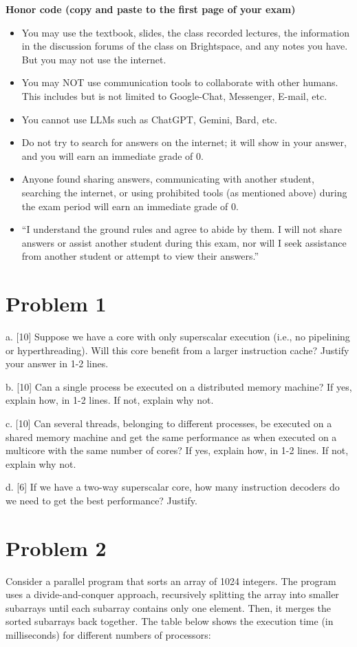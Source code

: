 \documentclass{article}
\begin{document}
\textbf{Honor code (copy and paste to the first page of your exam)}

\begin{itemize}
    \item You may use the textbook, slides, the class recorded lectures, the information in the discussion forums of the class on Brightspace, and any notes you have. But you may not use the internet.
    \item You may NOT use communication tools to collaborate with other humans. This includes but is not limited to Google-Chat, Messenger, E-mail, etc.
    \item You cannot use LLMs such as ChatGPT, Gemini, Bard, etc.
    \item Do not try to search for answers on the internet; it will show in your answer, and you will earn an immediate grade of 0.
    \item Anyone found sharing answers, communicating with another student, searching the internet, or using prohibited tools (as mentioned above) during the exam period will earn an immediate grade of 0.
    \item “I understand the ground rules and agree to abide by them. I will not share answers or assist another student during this exam, nor will I seek assistance from another student or attempt to view their answers.”
\end{itemize}

\section*{Problem 1}
a. [10]  Suppose we have a core with only superscalar execution (i.e., no pipelining or hyperthreading). Will this core benefit from a larger instruction cache? Justify your answer in 1-2 lines.

b. [10]  Can a single process be executed on a distributed memory machine? If yes, explain how, in 1-2 lines. If not, explain why not.

c. [10] Can several threads, belonging to different processes, be executed on a shared memory machine and get the same performance as when executed on a multicore with the same number of cores? If yes, explain how, in 1-2 lines. If not, explain why not.

d. [6] If we have a two-way superscalar core, how many instruction decoders do we need to get the best performance? Justify.


\section*{Problem 2}
Consider a parallel program that sorts an array of 1024 integers. The program uses a divide-and-conquer approach, recursively splitting the array into smaller subarrays until each subarray contains only one element. Then, it merges the sorted subarrays back together.  The table below shows the execution time (in milliseconds) for different numbers of processors:
\end{document}
